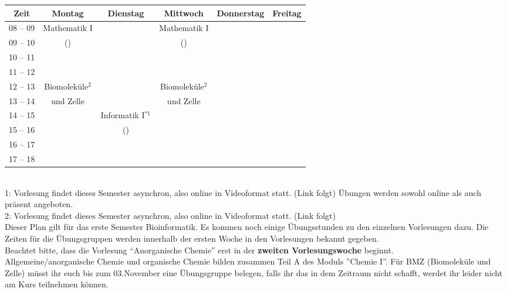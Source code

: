 \begin{minipage}{\textwidth}
    \footnotesize
\begin{tabular}{|c|c|c|c|c|c|} \hline
Zeit      & 		Montag 		& Dienstag			& Mittwoch 			& Donnerstag 			& Freitag\\\hline\hline
08 -- 09  & 		Mathematik I 	&  				& Mathematik I 		        &  				&\\\cline{1-1}\cline{3-3}\cline{5-6}
09 -- 10  & 		(\Matheprof)    &   				 & (\Matheprof)                 &  				&\\\hline
10 -- 11  &				&				&				&				&\\\hline
11 -- 12 & 				&  				&				&  			        &\\\hline
12 -- 13 & 		Biomoleküle$^2$	&  	                        & Biomoleküle$^2$    & 			            		&  \\\cline{1-1}\cline{3-3}\cline{5-6}
13 -- 14 & 		und Zelle       & 		                & und Zelle           & 					&  \\\hline
14 -- 15 & 				& Informatik I$^{*1}$ &                				&  				& \\\cline{1-2}\cline{4-6}
15 -- 16 &			                & (\Infoprof) 	    & 					& 				&\\\cline{1-3} \cline{5-6}
16 -- 17 & & & & &\\\hline
17 -- 18 & & & & & \\\hline
\end{tabular}
\end{minipage}
\\
1: Vorlesung findet dieses Semester asynchron, also online in Videoformat statt. (Link folgt) Übungen werden sowohl online als auch präsent angeboten.\\
2: Vorlesung findet dieses Semester asynchron, also online in Videoformat statt. (Link folgt)
\\
Dieser Plan gilt für das erste Semester Bioinformatik. Es kommen noch einige Übungsstunden
zu den einzelnen Vorlesungen dazu. Die Zeiten für die Übungsgruppen werden innerhalb der ersten Woche in den Vorlesungen bekannt gegeben.\\
Beachtet bitte, dass die Vorlesung "`Anorganische Chemie"' erst in der \textbf{zweiten Vorlesungswoche} beginnt.\\
Allgemeine/anorganische Chemie und organische Chemie bilden zusammen Teil A des Moduls ''Chemie I''.
Für BMZ (Biomoleküle und Zelle) müsst ihr euch bis zum 03.November eine Übungsgruppe belegen, falls ihr das in dem Zeitraum nicht schafft, werdet ihr leider nicht am Kurs teilnehmen können.


